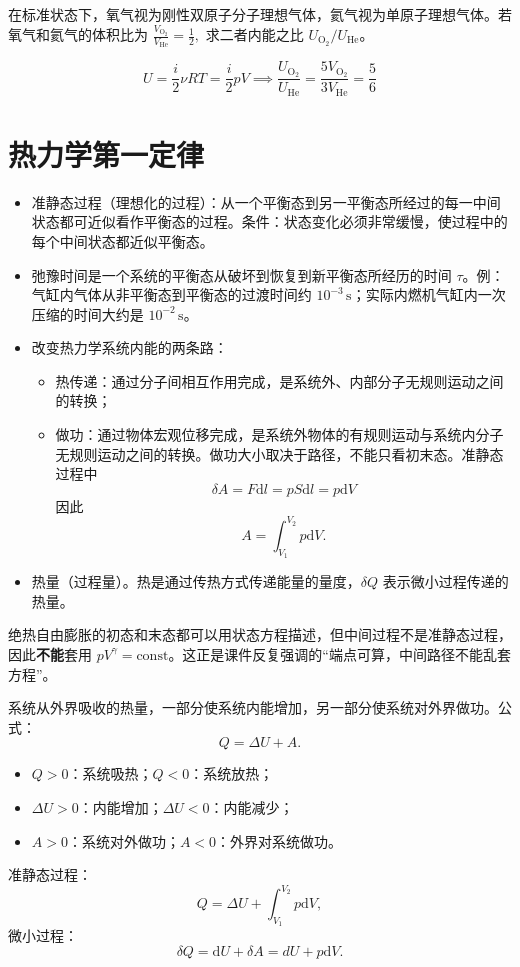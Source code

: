 \documentclass[lang=cn,11pt]{elegantbook}
\begin{document}
\begin{exercise}
在标准状态下，氧气视为刚性双原子分子理想气体，氦气视为单原子理想气体。若氧气和氦气的体积比为
 \(\frac{V_{\mathrm{O_2}}}{V_{\mathrm{He}}}=\frac12,\) 
求二者内能之比 \(U_{\mathrm{O_2}}/U_{\mathrm{He}}\)。
\end{exercise}
\begin{solution}
 \[U=\frac{i}{2}\nu RT=\frac{i}{2}pV \implies \frac{U_{\mathrm{O_2}}}{U_{\mathrm{He}}}=\frac{5V_{\mathrm{O_2}}}{3V_{\mathrm{He}}} =\frac56\]
\end{solution}


\chapter{热力学第一定律}

\begin{definition}
    \begin{itemize}
    \item 准静态过程（理想化的过程）：从一个平衡态到另一平衡态所经过的每一中间状态都可近似看作平衡态的过程。条件：状态变化必须非常缓慢，使过程中的每个中间状态都近似平衡态。
    \item 弛豫时间是一个系统的平衡态从破坏到恢复到新平衡态所经历的时间 \(\tau\)。例：气缸内气体从非平衡态到平衡态的过渡时间约 \(10^{-3}\,\text{s}\)；实际内燃机气缸内一次压缩的时间大约是 \(10^{-2}\,\text{s}\)。
    \item 改变热力学系统内能的两条路：
    \begin{itemize}
    \item 热传递：通过分子间相互作用完成，是系统外、内部分子无规则运动之间的转换；
    \item 做功：通过物体宏观位移完成，是系统外物体的有规则运动与系统内分子无规则运动之间的转换。做功大小取决于路径，不能只看初末态。准静态过程中\[\delta A = F\mathrm dl = pS\mathrm dl = p\mathrm dV\]因此\[A=\int_{V_1}^{V_2}p\mathrm dV.\]
    \end{itemize}
    \item 热量（过程量）。热是通过传热方式传递能量的量度，\(\delta Q\) 表示微小过程传递的热量。
    \end{itemize}
\end{definition}
绝热自由膨胀的初态和末态都可以用状态方程描述，但中间过程不是准静态过程，因此\textbf{不能}套用 \(pV^\gamma=\text{const}\)。这正是课件反复强调的“端点可算，中间路径不能乱套方程”。
\begin{theorem}[热力学第一定律]
系统从外界吸收的热量，一部分使系统内能增加，另一部分使系统对外界做功。公式：
\[
Q=\Delta U+A.
\]
\begin{itemize}
    \item \(Q>0\)：系统吸热；\(Q<0\)：系统放热；
    \item \(\Delta U>0\)：内能增加；\(\Delta U<0\)：内能减少；
    \item \(A>0\)：系统对外做功；\(A<0\)：外界对系统做功。
\end{itemize}
准静态过程：\[
Q=\Delta U+\int_{V_1}^{V_2}p\mathrm dV,
\]微小过程：\[
\delta Q=\mathrm dU+\delta A=dU+p\mathrm dV.
\]
\end{theorem}
\end{document}
